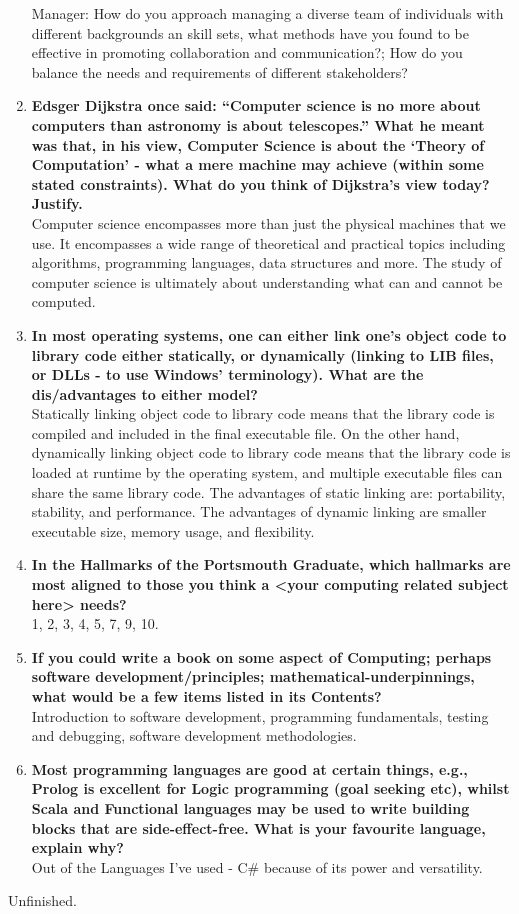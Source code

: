 \begin{enumerate}
    Manager: How do you approach managing a diverse team of individuals with different backgrounds an skill sets, what methods have you found to be effective in promoting collaboration and communication?; How do you balance the needs and requirements of different stakeholders?
    \item \textbf{Edsger Dijkstra once said: “Computer science is no more about computers than astronomy is about telescopes.” What he meant was that, in his view, Computer Science is about the `Theory of Computation' - what a mere machine may achieve (within some stated constraints). What do you think of Dijkstra's view today?  Justify.}\\
    Computer science encompasses more than just the physical machines that we use. It encompasses a wide range of theoretical and practical topics including algorithms, programming languages, data structures and more. The study of computer science is ultimately about understanding what can and cannot be computed. 
    \item \textbf{In most operating systems, one can either link one's object code to library code either statically, or dynamically (linking to LIB files, or DLLs - to use Windows' terminology).  What are the dis/advantages to either model?}\\
    Statically linking object code to library code means that the library code is compiled and included in the final executable file. On the other hand, dynamically linking object code to library code means that the library code is loaded at runtime by the operating system, and multiple executable files can share the same library code. The advantages of static linking are: portability, stability, and performance. The advantages of dynamic linking are smaller executable size, memory usage, and flexibility. 
    \item \textbf{In the Hallmarks of the Portsmouth Graduate, which hallmarks are most aligned to those you think a <your computing related subject here> needs?}\\
    1, 2, 3, 4, 5, 7, 9, 10.
    \item \textbf{If you could write a book on some aspect of Computing; perhaps software development/principles; mathematical-underpinnings, what would be a few items listed in its Contents?}\\
    Introduction to software development, programming fundamentals, testing and debugging, software development methodologies.
    \item \textbf{Most programming languages are good at certain things, e.g., Prolog is excellent for Logic programming (goal seeking etc), whilst Scala and Functional languages may be used to write building blocks that are side-effect-free.  What is your favourite language, explain why?}\\
    Out of the Languages I've used - C\# because of its power and versatility.
\end{enumerate}

Unfinished.